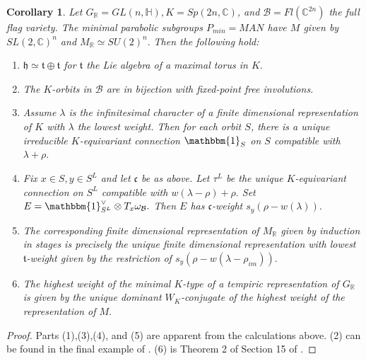 \documentclass[letterpaper,twosided,11pt]{article}
\theoremstyle{plain}
\newtheorem{corollary}[theorem]{Corollary}
\theoremstyle{definition}
\theoremstyle{remark}
\newcommand{\C}{\mathbb{C}}
\newcommand{\HH}{\mathbb{H}}
\newcommand{\R}{\mathbb{R}}
\newcommand{\ds}{\oplus}
\newcommand{\tensor}{\otimes}
\newcommand{\lie}[1]{\mathfrak{#1}}
\begin{document}
\begin{corollary}
    Let $ G_\R=GL(n,\HH), K=Sp(2n,\C) $, and $ \mathcal{B}=Fl(\C^{2n}) $
    the full flag variety.  The minimal parabolic subgroups $ P_{min}=MAN
    $ have $ M $ given by $ SL(2,\C)^n $ and $ M_\R\simeq SU(2)^n. $
    Then the following hold:
    \begin{enumerate}
        \item
            $ \lie{h}\simeq \lie{t}\ds \lie{t} $ for $ \lie{t} $ the Lie
            algebra of a maximal torus in $ K. $
        \item
            \cite{RichardsonSpringer1990} The $ K $-orbits in $ \mathcal
            {B} $ are in bijection with fixed-point free involutions.
        \item
            Assume $ \lambda$ is the infinitesimal
            character of a finite dimensional representation of $ K $
            with $ \lambda $ the lowest weight.  Then for each orbit $ S
            $, there is a unique irreducible $ K $-equivariant
            connection $ \mathbbm{1}_S $ on $ S $ compatible with $
            \lambda+\rho. $
        \item
            Fix $ x\in S, y\in S^L $ and let $ \lie{c} $ be as above.
            Let $ \tau^L $ be the unique $ K $-equivariant connection on
            $ S^L $ compatible with $ w(\lambda-\rho)+\rho. $ Set $ E=\mathbbm
            {1}_{S^L}^\vee\tensor T_x\omega_\mathcal{B}. $ Then $ E $
            has $ \lie{c} $-weight $ s_y(\rho-w(\lambda)). $
        \item
            The corresponding finite dimensional representation of $ M_\R
            $ given by induction in stages is precisely the unique
            finite dimensional representation with lowest $ \lie{t} $-weight
            given by the restriction of $ s_y(\rho-w(\lambda-\rho_{im})).
            $
        \item
            \cite{Primc1979} The highest weight of the minimal $ K $-type
            of a tempiric representation of $ G_\R $ is given by the
            unique dominant $ W_K $-conjugate of the highest weight of
            the representation of $ M. $
    \end{enumerate}
\end{corollary}

\begin{proof}
    Parts (1),(3),(4), and (5) are apparent from the calculations above.  (2) can
    be found in the final example of
    \cite{RichardsonSpringer1990}.  (6) is Theorem 2 of Section 15 of
    \cite{Primc1979}.  
\end{proof}
\end{document}
